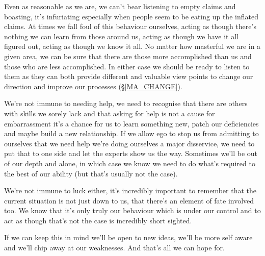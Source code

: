 \cleartorightpage
{\small

Even as reasonable as we are, we can't bear listening to empty claims and boasting, it's infuriating especially when people seem to be eating up the inflated claims. At times we fall foul of this behaviour ourselves, acting as though there's nothing we can learn from those around us, acting as though we have it all figured out, acting as though we know it all. No matter how masterful we are in a given area, we can be sure that there are those more accomplished than us and those who are less accomplished. In either case we should be ready to listen to them as they can both provide different and valuable view points to change our direction and improve our processes (\S \ref{MA_CHANGE}).

We're not immune to needing help, we need to recognise that there are others with skills we sorely lack and that asking for help is not a cause for embarrassment it's a chance for us to learn something new, patch our deficiencies and maybe build a new relationship. If we allow ego to stop us from admitting to ourselves that we need help we're doing ourselves a major disservice, we need to put that to one side and let the experts show us the way. Sometimes we'll be out of our depth and alone, in which case we know we need to do what's required to the best of our ability (but that's usually not the case).

We're not immune to luck either, it's incredibly important to remember that the current situation is not just down to us, that there's an element of fate involved too. We know that it's only truly our behaviour which is under our control and to act as though that's not the case is incredibly short sighted.

If we can keep this in mind we'll be open to new ideas, we'll be more self aware and we'll chip away at our weaknesses. And that's all we can hope for.

}
\cleartoleftpage
